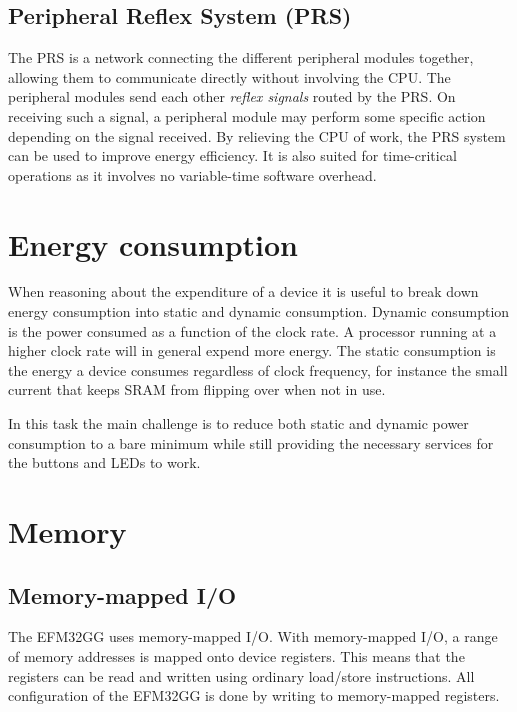 \subsection{Peripheral Reflex System (PRS)}
The PRS is a network connecting the different peripheral modules together, allowing them to communicate directly without involving the CPU. The peripheral modules send each other \emph{reflex signals} routed by the PRS. On receiving such a signal, a peripheral module may perform some specific action depending on the signal received. By relieving the CPU of work, the PRS system can be used to improve energy efficiency. It is also suited for time-critical operations as it involves no variable-time software overhead.



\section{Energy consumption}

When reasoning about the expenditure of a device it is useful to break down energy consumption into static and dynamic consumption. Dynamic consumption is the power consumed as a function of the clock rate. A processor running at a higher clock rate will in general expend more energy. The static consumption is the energy a device consumes regardless of clock frequency, for instance the small current that keeps SRAM from flipping over when not in use. 

In this task the main challenge is to reduce both static and dynamic power consumption to a bare minimum while still providing the necessary services for the buttons and LEDs to work.



\section{Memory}

\subsection{Memory-mapped I/O}
The EFM32GG uses memory-mapped I/O. With memory-mapped I/O, a range of memory addresses is mapped onto device registers. This means that the registers can be read and written using ordinary load/store instructions. All configuration of the EFM32GG is done by writing to memory-mapped registers.\cite{EFM32GG-RM}

